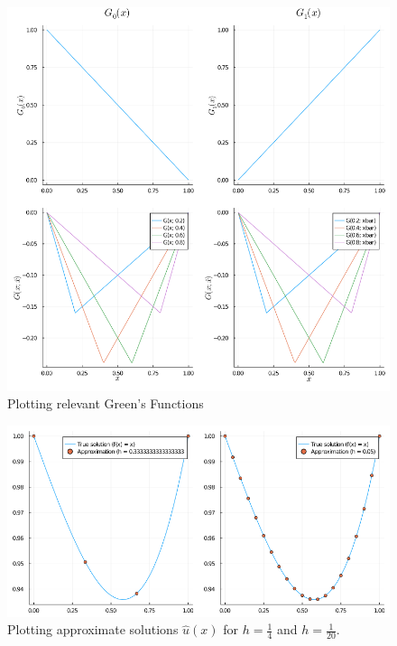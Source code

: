 \documentclass[12pt]{article}
\theoremstyle{definition}
\theoremstyle{remark}
\begin{document}
\begin{figure}[ht]
    \centering
    \includegraphics[width=0.7\linewidth]{figs/hw-2-greens-plot.png}
    \caption{Plotting relevant Green's Functions}%
    \label{fig:figs/}
\end{figure}

\begin{figure}[ht]
    \centering
    \includegraphics[width=0.7\linewidth]{figs/hw-2-approx-plot.png}
    \caption{Plotting approximate solutions $\hat{u}(x)$  for $h = \frac{1}{4}$ and $h=\frac{1}{20}$.}
    \label{fig:figs/hw-2-approx-plot}
\end{figure}

\newpage

\

\newpage

\

\newpage
\end{document}
